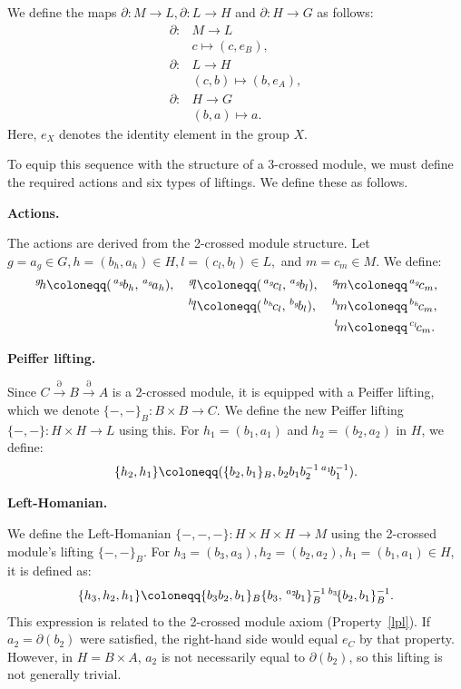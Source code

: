 \documentclass{tac}
\newcommand{\act}[1]{\,\sp{#1}\!}
\newcommand{\del}{\partial}
\renewcommand{\to}{\rightarrow}
\begin{document}
We define the maps $\del:M \rightarrow L, \del:L \rightarrow H$ and $\del:H \rightarrow G$ as follows:
\begin{equation}
\label{ex2:del}
\begin{aligned}
\del : &M \longrightarrow L\\
   &c  \longmapsto (c, e_B), \\
\del : &L \longrightarrow H\\
   &(c,b)  \longmapsto (b, e_A),\\
\del : &H \longrightarrow G\\
   &(b,a)  \longmapsto a.         
\end{aligned}
\end{equation}
Here, $e_X$ denotes the identity element in the group $X$.

To equip this sequence with the structure of a 3-crossed module, we must define the required actions and six types of liftings. We define these as follows.

\textbf{Actions.}

The actions are derived from the 2-crossed module structure. Let $g=a_g \in G, h=(b_h, a_h) \in H, l=(c_l, b_l) \in L,$ and $m = c_m \in M$. We define:
\begin{equation}
\begin{aligned}
  \act{g}h &\coloneqq  (\act{a_g}b_h,\act{a_g}a_h), & \act{g}l &\coloneqq  (\act{a_g}c_l,\act{a_g}b_l), & \act{g}m &\coloneqq  \act{a_g}c_m, \\
  && \act{h}l &\coloneqq  (\act{b_h}c_l,\act{b_g}b_l), & \act{h}m &\coloneqq  \act{b_h}c_m, \\
  &&&& \act{l}m &\coloneqq  \act{c_l}c_m.
\end{aligned}
\end{equation}


\textbf{Peiffer lifting.}

Since $C\xrightarrow{\partial}B \xrightarrow{\partial} A$ is a 2-crossed module, it is equipped with a Peiffer lifting, which we denote $\{-,-\}_B : B \times B \to C$. We define the new Peiffer lifting $\{-,-\} : H \times H \to L$ using this. For $h_1=(b_1, a_1)$ and $h_2=(b_2, a_2)$ in $H$, we define:
\begin{align}
\{h_2, h_1\} \coloneqq (\{b_2, b_1\}_B, b_2b_1b_2^{-1} \act{a_1}b_1^{-1} ).
\end{align}


\textbf{Left-Homanian.}

We define the Left-Homanian $\{-, -, -\} : H \times H \times H \to M$ using the 2-crossed module's lifting $\{-,-\}_B$.  For $h_3 = (b_3, a_3), h_2 = (b_2, a_2), h_1 = (b_1, a_1) \in H$, it is defined as:
\begin{align}
\label{ex_lhmn}
\{h_3,h_2,h_1\} \coloneqq \{b_3b_2,b_1\}_B\{b_3,\act{a_2}b_1\}_B^{-1}\act{b_3}\{b_2,b_1\}_B^{-1}.
\end{align}
This expression is related to the 2-crossed module axiom (Property~\ref{lpl}). If $a_2 = \del (b_2)$ were satisfied, the right-hand side would equal $e_C$ by that property. However, in $H = B \times A$, $a_2$ is not necessarily equal to $\del(b_2)$, so this lifting is not generally trivial.
\end{document}
